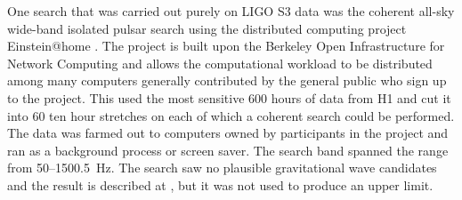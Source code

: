 \documentclass{article}
\begin{document}
One search that was carried out purely on LIGO S3 data was the coherent all-sky
wide-band isolated pulsar search using the distributed computing project
Einstein@home \cite{eath}. The project is built upon the Berkeley Open
Infrastructure for Network Computing \cite{BOINC} and allows the computational
workload to be distributed among many computers generally contributed by the
general public who sign up to the project. This used the most sensitive 600 
hours of data from H1 and cut it into 60 ten hour stretches on each of which
a coherent search could be performed. The data was farmed out to computers owned
by participants in the project and ran as a background process or screen saver.
The search band spanned the range from 50--1500.5~Hz. The search saw no
plausible gravitational wave candidates and the result is described at
\cite{eathS3}, but it was not used to produce an upper limit.
\end{document}
